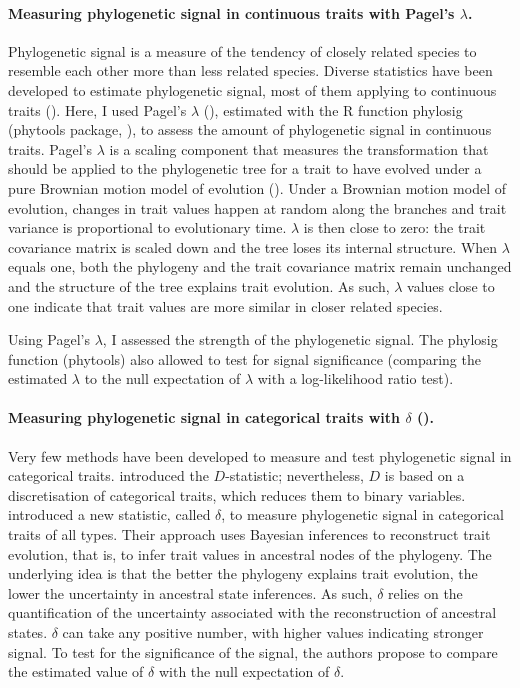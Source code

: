 \paragraph{Measuring phylogenetic signal in continuous traits with Pagel's $\lambda$.}
Phylogenetic signal is a measure of the tendency of closely related species to resemble each other more than less related species. Diverse statistics have been developed to estimate phylogenetic signal, most of them applying to continuous traits (\cite{Munkemuller2012}). Here, I used Pagel's $\lambda$ (\cite{Pagel1999}), estimated with the R function phylosig (phytools package, \cite{Revell2016}), to assess the amount of phylogenetic signal in continuous traits. Pagel's $\lambda$ is a scaling component that measures the transformation that should be applied to the phylogenetic tree for a trait to have evolved under a pure Brownian motion model of evolution (\cite{Munkemuller2012}). Under a Brownian motion model of evolution, changes in trait values happen at random along the branches and trait variance is proportional to evolutionary time.  $\lambda$ is then close to zero: the trait covariance matrix is scaled down and the tree loses its internal structure. When $\lambda$ equals one, both the phylogeny and the trait covariance matrix remain unchanged and the structure of the tree explains trait evolution. As such, $\lambda$ values close to one indicate that trait values are more similar in closer related species.  

Using Pagel's $\lambda$, I assessed the strength of the phylogenetic signal. The phylosig function (phytools) also allowed to test for signal significance (comparing the estimated $\lambda$ to the null expectation of $\lambda$ with a log-likelihood ratio test). 

\paragraph{Measuring phylogenetic signal in categorical traits with $\delta$ (\cite{Borges2018}).}
Very few methods have been developed to measure and test phylogenetic signal in categorical traits. \cite{Fritz2009} introduced the $D$-statistic; nevertheless, $D$ is based on a discretisation of categorical traits, which reduces them to binary variables. \cite{Borges2018} introduced a new statistic, called $\delta$, to measure phylogenetic signal in categorical traits of all types. Their approach uses Bayesian inferences to reconstruct trait evolution, that is, to infer trait values in ancestral nodes of the phylogeny. The underlying idea is that the  better the phylogeny explains trait evolution, the lower the uncertainty in ancestral state inferences. As such, $\delta$ relies on the quantification of the uncertainty associated with the reconstruction of ancestral states. $\delta$ can take any positive number, with higher values indicating stronger signal. To test for the significance of the signal, the authors propose to compare the estimated value of $\delta$ with the null expectation  of $\delta$. 


